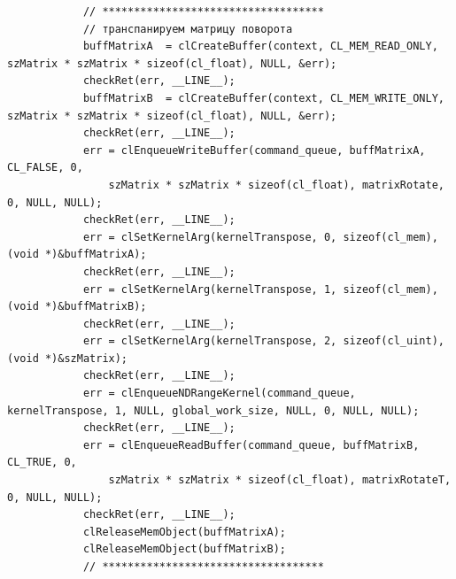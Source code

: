 \documentclass[utf8, 12pt, a4paper, oneside]{article}
\begin{document}
\begin{lstlisting}
			// ***********************************            			
			// транспанируем матрицу поворота
            buffMatrixA  = clCreateBuffer(context, CL_MEM_READ_ONLY, szMatrix * szMatrix * sizeof(cl_float), NULL, &err);
            checkRet(err, __LINE__);
            buffMatrixB  = clCreateBuffer(context, CL_MEM_WRITE_ONLY, szMatrix * szMatrix * sizeof(cl_float), NULL, &err);
            checkRet(err, __LINE__);
            err = clEnqueueWriteBuffer(command_queue, buffMatrixA, CL_FALSE, 0, 
                szMatrix * szMatrix * sizeof(cl_float), matrixRotate, 0, NULL, NULL);        
            checkRet(err, __LINE__);
            err = clSetKernelArg(kernelTranspose, 0, sizeof(cl_mem), (void *)&buffMatrixA);
            checkRet(err, __LINE__);            
            err = clSetKernelArg(kernelTranspose, 1, sizeof(cl_mem), (void *)&buffMatrixB);
            checkRet(err, __LINE__);            
            err = clSetKernelArg(kernelTranspose, 2, sizeof(cl_uint), (void *)&szMatrix);
            checkRet(err, __LINE__);                        
            err = clEnqueueNDRangeKernel(command_queue, kernelTranspose, 1, NULL, global_work_size, NULL, 0, NULL, NULL);
            checkRet(err, __LINE__);
            err = clEnqueueReadBuffer(command_queue, buffMatrixB, CL_TRUE, 0, 
                szMatrix * szMatrix * sizeof(cl_float), matrixRotateT, 0, NULL, NULL);
            checkRet(err, __LINE__);
            clReleaseMemObject(buffMatrixA);
            clReleaseMemObject(buffMatrixB);
            // ***********************************            			


\end{lstlisting}
\end{document}
